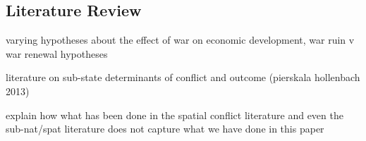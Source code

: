 \subsection{Literature Review}
\label{lit}

varying hypotheses about the effect of war on economic development, war ruin v war renewal hypotheses

literature on sub-state determinants of conflict and outcome (pierskala hollenbach 2013)

	explain how what has been done in the spatial conflict literature and even the sub-nat/spat literature does not capture what we have done in this paper


